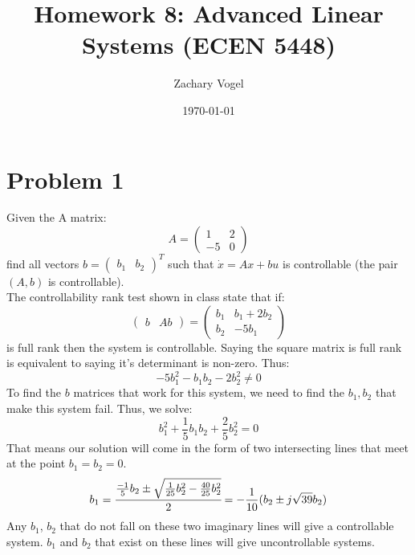 \documentclass{article}
\title{Homework 8: Advanced Linear Systems (ECEN 5448)}
\author{Zachary Vogel}
\date{\today}
\begin{document}
\maketitle

\section*{Problem 1}
Given the A matrix:
\[A=\begin{pmatrix}1&2\\-5&0\end{pmatrix}\]
find all vectors $b=\begin{pmatrix}b_1&b_2\end{pmatrix}^T$ such that $\dot{x}=Ax+bu$ is controllable (the pair $(A,b)$ is controllable).\\
The controllability rank test shown in class state that if:
\[\begin{pmatrix}b &Ab\end{pmatrix}=\begin{pmatrix}b_1&b_1+2b_2\\b_2&-5b_1\end{pmatrix}\]
is full rank then the system is controllable. Saying the square  matrix is full rank is equivalent to saying it's determinant is non-zero. Thus:
\[-5b_1^2-b_1b_2-2b_2^2\neq 0\]
To find the $b$ matrices that work for this system, we need to find the $b_1,b_2$ that make this system fail. Thus, we solve:
\[b_1^2+\frac{1}{5}b_1b_2+\frac{2}{5}b_2^2=0\]
That means our solution will come in the form of two intersecting lines that meet at the point $b_1=b_2=0$.\\
\[b_1=\cfrac{\frac{-1}{5}b_2\pm\sqrt{\frac{1}{25}b_2^2-\frac{40}{25}b_2^2}}{2}=-\frac{1}{10}(b_2\pm j\sqrt{39}b_2)\]
Any $b_1$, $b_2$ that do not fall on these two imaginary lines will give a controllable system. $b_1$ and $b_2$ that exist on these lines will give uncontrollable systems.\\
\end{document}
